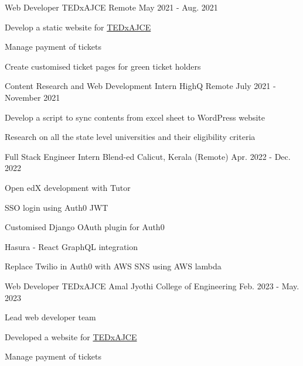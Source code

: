 
\begin{cventries}
  \cventry
    {Web Developer} %
    {TEDxAJCE} %
    {Remote}
    {May 2021 - Aug. 2021} %
    {
      \begin{cvitems} %
        \item Develop a static website for \hyperlink{https://www.tedxajce.in/tedx2021}{TEDxAJCE}
        \item Manage payment of tickets
        \item Create customised ticket pages for green ticket holders
      \end{cvitems}
    }

  \cventry
    {Content Research and Web Development Intern} %
    {HighQ} %
    {Remote} %
    {July 2021 - November 2021} %
    {
      \begin{cvitems} %
        \item Develop a script to sync contents from excel sheet to WordPress website
        \item Research on all the state level universities and their eligibility criteria
      \end{cvitems}
    }

  \cventry
    {Full Stack Engineer Intern} %
    {Blend-ed} %
    {Calicut, Kerala (Remote)   } %
    {Apr. 2022 - Dec. 2022} %
    {
      \begin{cvitems} %
        \item Open edX development with Tutor
        \item SSO login using Auth0 JWT
        \item Customised Django OAuth plugin for Auth0
        \item Hasura - React GraphQL integration
        \item Replace Twilio in Auth0 with AWS SNS using AWS lambda
      \end{cvitems}
    }

  \cventry
    {Web Developer} %
    {TEDxAJCE} %
    {Amal Jyothi College of Engineering}
    {Feb. 2023 - May. 2023} %
    {
      \begin{cvitems} %
        \item Lead web developer team
        \item Developed a website for \hyperlink{https://www.tedxajce.in/tedx2023}{TEDxAJCE}
        \item Manage payment of tickets
      \end{cvitems}
    }


\end{cventries}
